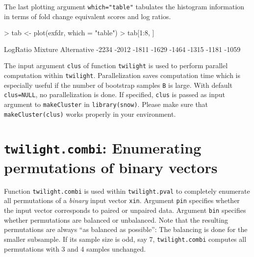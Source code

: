 \documentclass[11pt,a4paper,fleqn]{report}
\newcommand{\Rfunction}[1]{{\texttt{#1}}}
\newcommand{\Rfunarg}[1]{{\texttt{#1}}}
\begin{document}
The last plotting argument \Rfunarg{which="table"} tabulates the histogram information in terms of fold change equivalent scores and log ratios.
\begin{Schunk}
\begin{Sinput}
> tab <- plot(exfdr, which = "table")
> tab[1:8, ]
\end{Sinput}
\begin{Soutput}
       LogRatio Mixture Alternative
-2234%    -3.15       2         1.6
-2012%    -3.05       0         0.0
-1811%    -2.95       1         1.0
-1629%    -2.85       0         0.0
-1464%    -2.75       0         0.0
-1315%    -2.65       1         1.0
-1181%    -2.55       0         0.0
-1059%    -2.45       1         1.0
\end{Soutput}
\end{Schunk}

The input argument \Rfunarg{clus} of function \Rfunction{twilight} is used to perform parallel computation within \Rfunction{twilight}. Parallelization saves computation time which is especially useful if the number of bootstrap samples \Rfunarg{B} is large. With default \Rfunarg{clus=NULL}, no parallelization is done. If specified, \Rfunarg{clus} is passed as input argument to \Rfunction{makeCluster} in \Rfunction{library(snow)}. Please make sure that \Rfunction{makeCluster(clus)} works properly in your environment.



\clearpage
\section{\Rfunction{twilight.combi}: Enumerating permutations of binary vectors}\label{twilight.combi}

\fbox{
\begin{minipage}{0.95\textwidth}
\Rfunction{twilight.combi(xin, pin, bin)}
\end{minipage}
}
\bigskip       

Function \Rfunction{twilight.combi} is used within \Rfunction{twilight.pval} to completely enumerate all permutations of a \textit{binary} input vector \Rfunarg{xin}. Argument \Rfunarg{pin} specifies whether the input vector corresponds to paired or unpaired data. Argument \Rfunarg{bin} specifies whether permutations are balanced or unbalanced. Note that the resulting permutations are always ``as balanced as possible'': The balancing is done for the smaller subsample. If its sample size is odd, say 7, \Rfunction{twilight.combi} computes all permutations with 3 and 4 samples unchanged.
\end{document}
